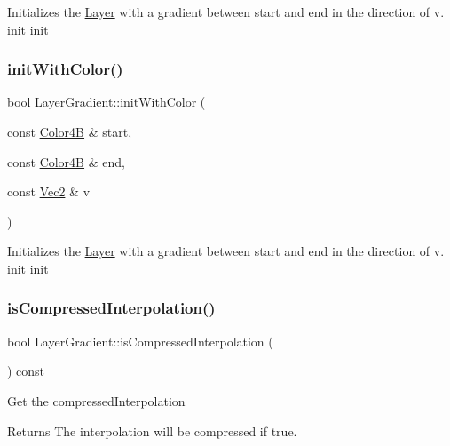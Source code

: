 Initializes the \hyperlink{classLayer}{Layer} with a gradient between start and end in the direction of v.  init  init \mbox{\label{classLayerGradient_abd19450a8badd0016dabdb6c3cf96f59}} 
\subsubsection{\texorpdfstring{init\+With\+Color()}{initWithColor()}\hspace{0.1cm}{\footnotesize\ttfamily [4/4]}}
{\footnotesize\ttfamily bool Layer\+Gradient\+::init\+With\+Color (\begin{DoxyParamCaption}\item[{const \hyperlink{structColor4B}{Color4B} \&}]{start,  }\item[{const \hyperlink{structColor4B}{Color4B} \&}]{end,  }\item[{const \hyperlink{classVec2}{Vec2} \&}]{v }\end{DoxyParamCaption})}

Initializes the \hyperlink{classLayer}{Layer} with a gradient between start and end in the direction of v.  init  init \mbox{\label{classLayerGradient_af26407251465e14e789b4d2b5948791a}} 
\subsubsection{\texorpdfstring{is\+Compressed\+Interpolation()}{isCompressedInterpolation()}\hspace{0.1cm}{\footnotesize\ttfamily [1/2]}}
{\footnotesize\ttfamily bool Layer\+Gradient\+::is\+Compressed\+Interpolation (\begin{DoxyParamCaption}{ }\end{DoxyParamCaption}) const}

Get the compressed\+Interpolation

\begin{DoxyReturn}{Returns}
The interpolation will be compressed if true. 
\end{DoxyReturn}
\mbox{\label{classLayerGradient_af26407251465e14e789b4d2b5948791a}} 

